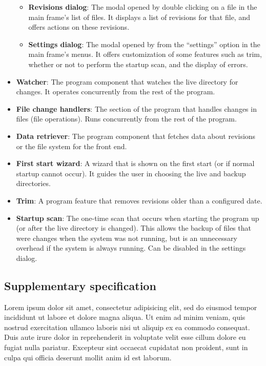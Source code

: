 \documentclass[12pt,a4paper]{article}
\begin{document}
\begin{itemize}
\begin{itemize}
	\item \textbf{Revisions dialog}: The modal opened by double clicking on a file in the main frame's list of files. It displays a list of revisions for that file, and offers actions on these revisions.
	\item \textbf{Settings dialog}: The modal opened by from the ``settings'' option in the main frame's menus. It offers customization of some features such as trim, whether or not to perform the startup scan, and the display of errors.
	\end{itemize}
\item \textbf{Watcher}: The program component that watches the live directory for changes. It operates concurrently from the rest of the program.
\item \textbf{File change handlers}: The section of the program that handles changes in files (file operations). Runs concurrently from the rest of the program.
\item \textbf{Data retriever}: The program component that fetches data about revisions or the file system for the front end.
\item \textbf{First start wizard}: A wizard that is shown on the first start (or if normal startup cannot occur). It guides the user in choosing the live and backup directories.
\item \textbf{Trim}: A program feature that removes revisions older than a configured date.
\item \textbf{Startup scan}: The one-time scan that occurs when starting the program up (or after the live directory is changed). This allows the backup of files that were changes when the system was not running, but is an unnecessary overhead if the system is always running. Can be disabled in the settings dialog.
\end{itemize}

\subsection{Supplementary specification}
Lorem ipsum dolor sit amet, consectetur adipisicing elit, sed do eiusmod tempor incididunt ut labore et dolore magna aliqua. Ut enim ad minim veniam, quis nostrud exercitation ullamco laboris nisi ut aliquip ex ea commodo consequat. Duis aute irure dolor in reprehenderit in voluptate velit esse cillum dolore eu fugiat nulla pariatur. Excepteur sint occaecat cupidatat non proident, sunt in culpa qui officia deserunt mollit anim id est laborum.
\end{document}

